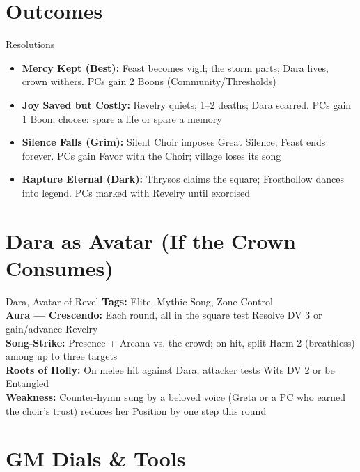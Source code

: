 \documentclass[11pt]{article}
\begin{document}
\section*{Outcomes}

\begin{mechanicsbox}{Resolutions}
\begin{itemize}
    \item \textbf{Mercy Kept (Best):} Feast becomes vigil; the storm parts; Dara lives, crown withers. PCs gain 2 Boons (Community/Thresholds)
    \item \textbf{Joy Saved but Costly:} Revelry quiets; 1--2 deaths; Dara scarred. PCs gain 1 Boon; choose: spare a life or spare a memory
    \item \textbf{Silence Falls (Grim):} Silent Choir imposes Great Silence; Feast ends forever. PCs gain Favor with the Choir; village loses its song
    \item \textbf{Rapture Eternal (Dark):} Thrysos claims the square; Frosthollow dances into legend. PCs marked with Revelry until exorcised
\end{itemize}
\end{mechanicsbox}

\section*{Dara as Avatar (If the Crown Consumes)}

\begin{npcbox}{Dara, Avatar of Revel}
    \textbf{Tags:} Elite, Mythic Song, Zone Control \\
    \textbf{Aura --- Crescendo:} Each round, all in the square test Resolve DV 3 or gain/advance Revelry \\
    \textbf{Song-Strike:} Presence + Arcana vs. the crowd; on hit, split Harm 2 (breathless) among up to three targets \\
    \textbf{Roots of Holly:} On melee hit against Dara, attacker tests Wits DV 2 or be Entangled \\
    \textbf{Weakness:} Counter-hymn sung by a beloved voice (Greta or a PC who earned the choir's trust) reduces her Position by one step this round
\end{npcbox}

\section*{GM Dials \& Tools}
\end{document}
